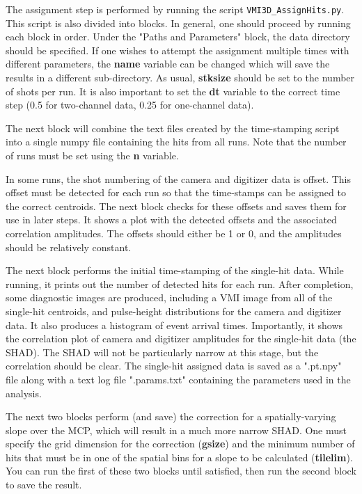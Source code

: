 \documentclass[12pt]{article}
\begin{document}
The assignment step is performed by running the script \texttt{VMI3D\_AssignHits.py}.
This script is also divided into blocks.
In general, one should proceed by running each block in order.
Under the "Paths and Parameters" block, the data directory should be specified.
If one wishes to attempt the assignment multiple times with different parameters, the \textbf{name} variable can be changed which will save the results in a different sub-directory.
As usual, \textbf{stksize} should be set to the number of shots per run.
It is also important to set the \textbf{dt} variable to the correct time step (0.5 for two-channel data, 0.25 for one-channel data).

The next block will combine the text files created by the time-stamping script into a single numpy file containing the hits from all runs.
Note that the number of runs must be set using the \textbf{n} variable.

In some runs, the shot numbering of the camera and digitizer data is offset.
This offset must be detected for each run so that the time-stamps can be assigned to the correct centroids.
The next block checks for these offsets and saves them for use in later steps.
It shows a plot with the detected offsets and the associated correlation amplitudes.
The offsets should either be 1 or 0, and the amplitudes should be relatively constant.

The next block performs the initial time-stamping of the single-hit data.
While running, it prints out the number of detected hits for each run.
After completion, some diagnostic images are produced, including a VMI image from all of the single-hit centroids, and pulse-height distributions for the camera and digitizer data.
It also produces a histogram of event arrival times.
Importantly, it shows the correlation plot of camera and digitizer amplitudes for the single-hit data (the SHAD).
The SHAD will not be particularly narrow at this stage, but the correlation should be clear.
The single-hit assigned data is saved as a ".pt.npy" file along with a text log file ".params.txt" containing the parameters used in the analysis.

The next two blocks perform (and save) the correction for a spatially-varying slope over the MCP, which will result in a much more narrow SHAD.
One must specify the grid dimension for the correction (\textbf{gsize}) and the minimum number of hits that must be in one of the spatial bins for a slope to be calculated (\textbf{tilelim}).
You can run the first of these two blocks until satisfied, then run the second block to save the result.
\end{document}
